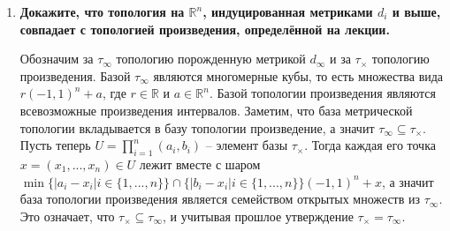 \documentclass{article}
\begin{document}
\begin{enumerate}
\begin{center}
        \end{center}
    \item \textbf{Докажите, что топология на $\mathbb{R}^n$, индуцированная
        метриками $d_i$ и выше, совпадает с топологией произведения,
        определённой на лекции.}\par
        Обозначим за $\tau_\infty$ топологию порожденную метрикой $d_\infty$
        и за $\tau_\times$ топологию произведения. Базой $\tau_\infty$ являются
        многомерные кубы, то есть множества вида $r(-1,1)^n+a$, где $r\in
        \mathbb{R}$ и $a\in\mathbb{R}^n$. Базой топологии произведения
        являются всевозможные произведения интервалов. Заметим, что база
        метрической топологии вкладывается в базу топологии произведение, а
        значит $\tau_\infty\subseteq\tau_\times$. Пусть теперь $U=\prod_{i=1}^n
        (a_i,b_i)$ – элемент базы $\tau_\times$. Тогда каждая его точка $x=(x_1
        ,...,x_n)\in U$ лежит вместе с шаром $\min\{|a_i-x_i|i\in\{1,...,n\}\}
        \cap\{|b_i-x_i|i\in\{1,...,n\}\}(-1,1)^n+x$, а значит база топологии
        произведения является семейством открытых множеств из $\tau_\infty$.
        Это означает, что $\tau_\times\subseteq\tau_\infty$, и учитывая прошлое
        утверждение $\tau_\times=\tau_\infty$.\par


\end{enumerate}
\end{document}
